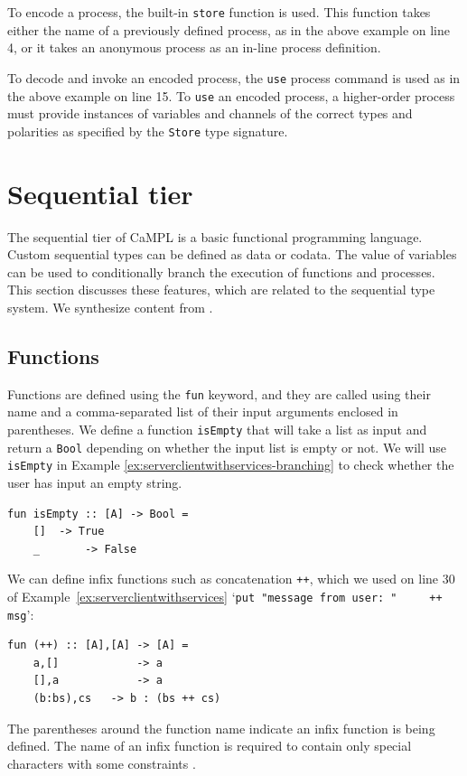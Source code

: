 \documentclass[acmsmall]{acmart}
\begin{document}
To encode a process, the built-in \lstinline$store$ function is used.
This function takes either the name of a previously defined process, as in the above example on line 4, or it takes an anonymous process as an in-line process definition.

To decode and invoke an encoded process, the \lstinline$use$ process command is used as in the above example on line 15.
To \lstinline$use$ an encoded process, a higher-order process must provide instances of variables and channels of the correct types and polarities as specified by the \lstinline$Store$ type signature.


\section{Sequential tier}
\label{Sec:SequentialTypes}

The sequential tier of CaMPL is a basic functional programming language.
Custom sequential types can be defined as data or codata.
The value of variables can be used to conditionally branch the execution of functions and processes.
This section discusses these features, which are related to the sequential type system.
We synthesize content from \cite{Ku18, Po21, Po22}.

\subsection{Functions}
\label{sec:funcs}

Functions are defined using the \lstinline{fun} keyword, and they are called using their name and a comma-separated list of their input arguments enclosed in parentheses.
We define a function \lstinline{isEmpty} that will take a list as input and return a \lstinline$Bool$ depending on whether the input list is empty or not. We will use \lstinline{isEmpty} in Example \ref{ex:serverclientwithservices-branching} to check whether the user has input an empty string.
\begin{lstlisting}[label=ex:isEmpty, caption=Sequential function that checks if a list is empty]
fun isEmpty :: [A] -> Bool =
	[]	-> True
	_		-> False
\end{lstlisting}
  
We can define infix functions such as concatenation \lstinline{++}, which we used on line 30 of Example~\ref{ex:serverclientwithservices} `\lstinline$put "message from user: "     ++ msg$':
\begin{lstlisting}[label=ex:concat, caption=Infix concatenation function]
fun (++) :: [A],[A] -> [A] =
	a,[]			-> a
	[],a 			-> a
	(b:bs),cs	-> b : (bs ++ cs)
\end{lstlisting}
The parentheses around the function name indicate an infix function is being defined.
The name of an infix function is required to contain only special characters with some constraints \cite{Fo23}.
\end{document}
